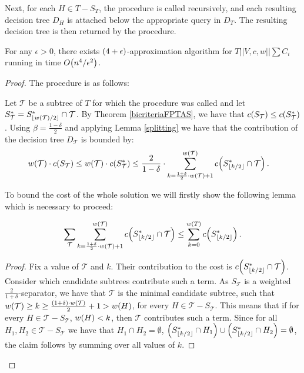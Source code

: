 Next, for each $H \in T-S_T$, the procedure is called recursively, and each resulting 
decision tree $D_H$ is attached below the appropriate query in $D_T$. The resulting decision tree is then returned by the procedure.
    \begin{theorem}
        For any $\epsilon>0$, there exists $\mathopen{}\left( 4+\epsilon \right)$-approximation algorithm for $T||V,c,w||\sum C_i$ running in time $O\mathopen{}\left( n^4/\epsilon^2 \right)$.
        \begin{proof}
            The procedure is as follows: 
            
            
        
            Let $\mathcal{T}$ be a subtree of $T$ for which the procedure was called and let $S_{\mathcal{T}}^*=S_{\mathopen{}\left\lfloor w\mathopen{}\left( \mathcal{T} \right)/2 \right\rfloor}^*\cap\mathcal{T}$. By Theorem \ref{bicriteriaFPTAS}, we have that $c\mathopen{}\left( S_{\mathcal{T}} \right)\leq c\mathopen{}\left( S_{\mathcal{T}}^* \right)$. Using $\beta=\frac{1-\delta}{2}$ and applying Lemma \ref{splitting} we have that the contribution of the decision tree $D_{\mathcal{T}}$ is bounded by:
            \begin{align*}
                w\mathopen{}\left( \mathcal{T} \right)\cdot c\mathopen{}\left( S_{\mathcal{T}} \right)
                &\leq w\mathopen{}\left( \mathcal{T} \right)\cdot c\mathopen{}\left( S_{\mathcal{T}}^* \right)\leq \frac{2}{1-\delta}\cdot \sum_{k=\frac{1+\delta}{2}\cdot w\mathopen{}\left( \mathcal{T} \right)+1}^{w\mathopen{}\left( \mathcal{T} \right)}c\mathopen{}\left( S_{\mathopen{}\left\lfloor k/2 \right\rfloor}^*\cap \mathcal{T} \right).
            \end{align*}
            
            To bound the cost of the whole solution we will firstly show the following lemma which is necessary to proceed:
            \begin{lemma}\label{up_trees}
            $$\sum_{\mathcal{T}}\sum_{k=\frac{1+\delta}{2}\cdot w\mathopen{}\left( \mathcal{T} \right)+1}^{w\mathopen{}\left( \mathcal{T} \right)}c\mathopen{}\left( S_{\mathopen{}\left\lfloor k/2 \right\rfloor}^*\cap \mathcal{T} \right)\leq \sum_{k=0}^{w\mathopen{}\left( T \right)}c\mathopen{}\left( S_{\mathopen{}\left\lfloor k/2 \right\rfloor}^* \right).$$
            \end{lemma}
            \begin{proof}
                Fix a value of $\mathcal{T}$ and $k$. Their contribution to the cost is $c\mathopen{}\left( S_{\mathopen{}\left\lfloor k/2 \right\rfloor}^*\cap \mathcal{T} \right)$. Consider which candidate subtrees contribute such a term. As $S_{\mathcal{T}}$ is a weighted $\frac{2}{1+\delta}$-separator, we have that $\mathcal{T}$ is the minimal candidate subtree, such that $w\mathopen{}\left( \mathcal{T} \right)\geq k\geq \frac{\mathopen{}\left( 1+\delta \right)\cdot w\mathopen{}\left( \mathcal{T} \right)}{2}+1 >w\mathopen{}\left( H \right)$, for every $H\in \mathcal{T}-S_{\mathcal{T}}$. This means that if for every $H\in \mathcal{T}-S_{\mathcal{T}}$, $w\mathopen{}\left( H \right)<k$, then $\mathcal{T}$ contributes such a term. Since for all $H_1, H_2\in \mathcal{T}-S_{\mathcal{T}}$ we have that $H_1\cap H_2=\emptyset$, $\mathopen{}\left( S_{\mathopen{}\left\lfloor k/2 \right\rfloor}^*\cap H_1 \right)\cup \mathopen{}\left( S_{\mathopen{}\left\lfloor k/2 \right\rfloor}^*\cap H_2 \right)=\emptyset$, the claim follows by summing over all values of $k$.
            \end{proof}
            

\end{proof}
\end{theorem}
